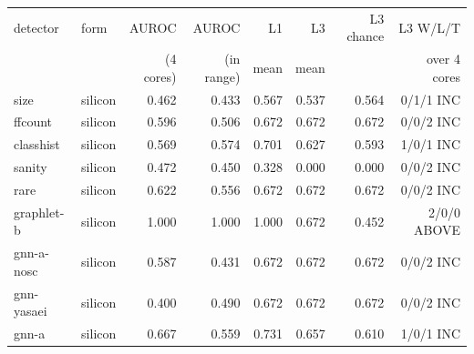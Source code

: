 \begin{tabular}{llrrrrrr}
\hline
detector & form & AUROC & AUROC & L1 & L3 & L3 chance & L3 W/L/T \\
 & & (4 cores) & (in range) & mean & mean & & over 4 cores \\
\hline
size & silicon & 0.462 & 0.433 & 0.567 & 0.537 & 0.564 & 0/1/1 INC \\
ffcount & silicon & 0.596 & 0.506 & 0.672 & 0.672 & 0.672 & 0/0/2 INC \\
classhist & silicon & 0.569 & 0.574 & 0.701 & 0.627 & 0.593 & 1/0/1 INC \\
sanity & silicon & 0.472 & 0.450 & 0.328 & 0.000 & 0.000 & 0/0/2 INC \\
rare & silicon & 0.622 & 0.556 & 0.672 & 0.672 & 0.672 & 0/0/2 INC \\
graphlet{-}b & silicon & 1.000 & 1.000 & 1.000 & 0.672 & 0.452 & 2/0/0 ABOVE \\
gnn{-}a{-}nosc & silicon & 0.587 & 0.431 & 0.672 & 0.672 & 0.672 & 0/0/2 INC \\
gnn{-}yasaei & silicon & 0.400 & 0.490 & 0.672 & 0.672 & 0.672 & 0/0/2 INC \\
gnn{-}a & silicon & 0.667 & 0.559 & 0.731 & 0.657 & 0.610 & 1/0/1 INC \\
\hline
\end{tabular}
